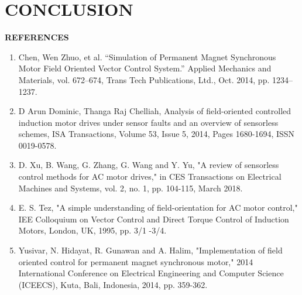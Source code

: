 \section{CONCLUSION}

\newpage


\begin{center}

    {\textbf{REFERENCES}}
\end{center}


\begin{enumerate}
    \item Chen, Wen Zhuo, et al. “Simulation of Permanent Magnet Synchronous Motor Field Oriented Vector Control System.” Applied Mechanics and Materials, vol. 672–674, Trans Tech Publications, Ltd., Oct. 2014, pp. 1234–1237.


          \vspace{5mm} %

    \item D Arun Dominic, Thanga Raj Chelliah,
          Analysis of field-oriented controlled induction motor drives under sensor faults and an overview of sensorless schemes,
          ISA Transactions,
          Volume 53, Issue 5,
          2014,
          Pages 1680-1694,
          ISSN 0019-0578.

          \vspace{5mm} %

    \item D. Xu, B. Wang, G. Zhang, G. Wang and Y. Yu, "A review of sensorless control methods for AC motor drives," in CES Transactions on Electrical Machines and Systems, vol. 2, no. 1, pp. 104-115, March 2018.


          \vspace{5mm} %

    \item  E. S. Tez, "A simple understanding of field-orientation for AC motor control," IEE Colloquium on Vector Control and Direct Torque Control of Induction Motors, London, UK, 1995, pp. 3/1 -3/4.

          \vspace{5mm} %


    \item  Yusivar, N. Hidayat, R. Gunawan and A. Halim, "Implementation of field oriented control for permanent magnet synchronous motor," 2014 International Conference on Electrical Engineering and Computer Science (ICEECS), Kuta, Bali, Indonesia, 2014, pp. 359-362.

\end{enumerate}
